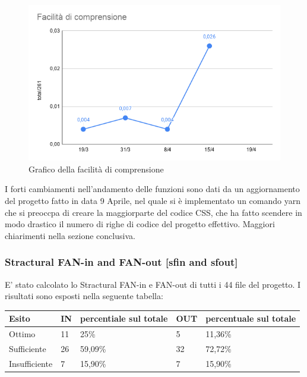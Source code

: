     \begin{figure}[H]
        \centering
        \includegraphics[width=10 cm]{source/sections/images/facilita_comprensione.png}
        \caption{Grafico della facilità di comprensione}
    \end{figure}

    I forti cambiamenti nell'andamento delle funzioni sono dati da un aggiornamento del progetto fatto in data
    9 Aprile, nel quale si è implementato un comando yarn che si preoccpa di creare la maggiorparte del
    codice CSS, che ha fatto scendere in modo drastico il numero di righe di codice del progetto effettivo. Maggiori chiarimenti nella sezione conclusiva.

\subsubsection{Stractural FAN-in and FAN-out  [sfin and sfout]}
    E' stato calcolato lo Stractural FAN-in e FAN-out di tutti i 44 file del progetto. I risultati sono esposti nella seguente tabella:

    \begin{longtabu} to \textwidth {| X[0.1,c m] | X[0.1,c m] | X[0.1,c m] | X[0.1,c m] | X[0.1,c m] |}
        \hline
        \textbf{Esito} &
        \textbf{IN} &
        \textbf{percentiale sul totale} &
        \textbf{OUT} &
        \textbf{percentuale sul totale} \\
        \hline
        Ottimo & 11 & 25\% & 5 & 11,36\% \\ 
        \hline
        Sufficiente & 26 & 59,09\% & 32 & 72,72\% \\ 
        \hline
        Insufficiente & 7 & 15,90\% & 7 & 15,90\% \\ 
        \hline

        \end{longtabu}

